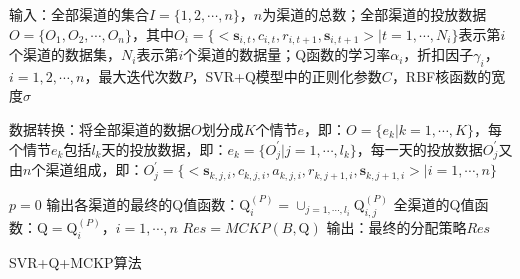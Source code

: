 \begin{algorithm}[htbp]
\small
\SetAlgoLined
{} 

输入：全部渠道的集合$I=\{1,2,\cdots,n\}$，$n$为渠道的总数；全部渠道的投放数据$O=\{O_{1},O_{2},\cdots,O_{n}\}$，其中$O_{i}=\{<\mathbf{s}_{i,t},c_{i,t},r_{i,t+1},\mathbf{s}_{i,t+1}>|t=1,\cdots,N_{i}\}$表示第$i$个渠道的数据集，$N_{i}$表示第$i$个渠道的数据量；Q函数的学习率$\alpha_{i}$，折扣因子$\gamma_{i}$，$i=1,2,\cdots,n$，最大迭代次数$P$，SVR+Q模型中的正则化参数$C$，RBF核函数的宽度$\sigma$\;


数据转换：将全部渠道的数据$O$划分成$K$个情节$e$，即：$O=\{e_{k}|k=1,\cdots,K\}$，每个情节$e_{k}$包括$l_{k}$天的投放数据，即：$e_{k}=\{O^{'}_{j}|j=1,\cdots,l_{k}\}$，每一天的投放数据$O^{'}_{j}$又由$n$个渠道组成，即：$O^{'}_{j}=\{<\mathbf{s}_{k,j,i},c_{k,j,i},a_{k,j,i},r_{k,j+1,i},\mathbf{s}_{k,j+1,i}>|i=1,\cdots,n\}$\;


$p=0$\;
输出各渠道的最终的Q值函数：$\text{Q}_{i}^{(P)}=\cup_{j=1,\cdots,l_{i}}\text{Q}_{i,j}^{(P)}$\; 
全渠道的Q值函数：$\text{Q}={\text{Q}_{i}^{(P)}}$，$i=1,\cdots,n$\;
$Res = MCKP(B,\text{Q})$\;
输出：最终的分配策略$Res$\;
\caption{SVR+Q+MCKP算法}
\label{algo:RBF-SVR+Q_final}
\end{algorithm}

